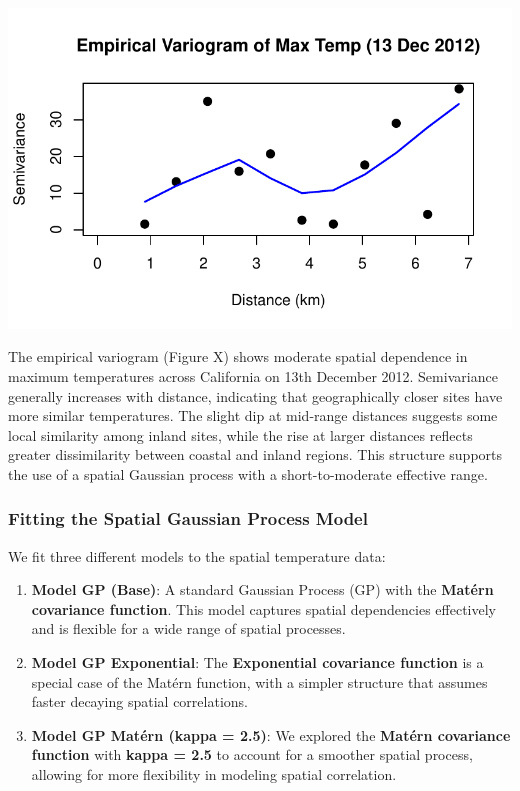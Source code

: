 \documentclass[
  11pt,
]{article}
\providecommand{\tightlist}{%
  \setlength{\itemsep}{0pt}\setlength{\parskip}{0pt}}\usepackage{longtable,booktabs,array}
\begin{document}
\includegraphics{project_files/figure-pdf/unnamed-chunk-71-1.pdf}

The empirical variogram (Figure X) shows moderate spatial dependence in
maximum temperatures across California on 13th December 2012.
Semivariance generally increases with distance, indicating that
geographically closer sites have more similar temperatures. The slight
dip at mid-range distances suggests some local similarity among inland
sites, while the rise at larger distances reflects greater dissimilarity
between coastal and inland regions. This structure supports the use of a
spatial Gaussian process with a short-to-moderate effective range.

\subsubsection{Fitting the Spatial Gaussian Process
Model}\label{fitting-the-spatial-gaussian-process-model}

We fit three different models to the spatial temperature data:

\begin{enumerate}
\def\labelenumi{\arabic{enumi}.}
\tightlist
\item
  \textbf{Model GP (Base)}: A standard Gaussian Process (GP) with the
  \textbf{Matérn covariance function}. This model captures spatial
  dependencies effectively and is flexible for a wide range of spatial
  processes.
\item
  \textbf{Model GP Exponential}: The \textbf{Exponential covariance
  function} is a special case of the Matérn function, with a simpler
  structure that assumes faster decaying spatial correlations.
\item
  \textbf{Model GP Matérn (kappa = 2.5)}: We explored the \textbf{Matérn
  covariance function} with \textbf{kappa = 2.5} to account for a
  smoother spatial process, allowing for more flexibility in modeling
  spatial correlation.
\end{enumerate}
\end{document}

